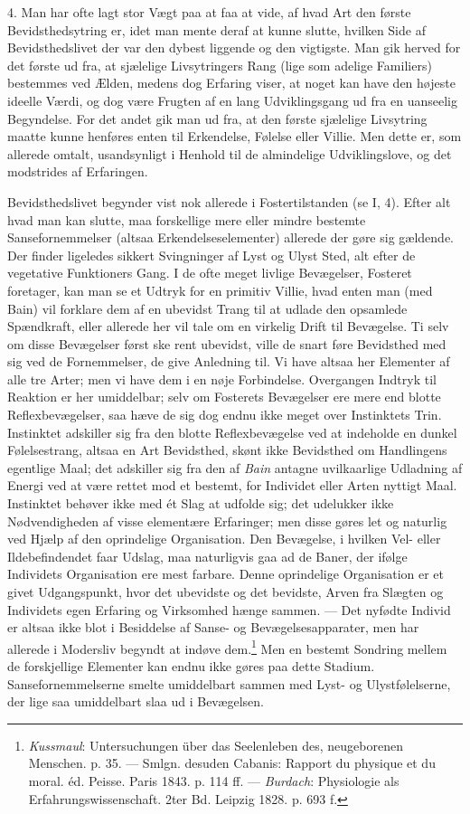 \documentclass[12pt,a4paper,openany]{book}
\newcommand{\opage}[1]{\marginnote{\footnotesize\textit{[#1]}}}
\begin{document}
4. Man har ofte lagt stor Vægt paa at faa at vide, af hvad Art den
første Bevidsthedsytring er, idet man mente deraf at kunne slutte,
hvilken Side af Bevidsthedslivet der var den dybest liggende og den
vigtigste. Man gik herved for det første ud fra, at sjælelige
Livsytringers Rang (lige som adelige Familiers) bestemmes ved Ælden,
medens dog Erfaring viser, at noget kan have den højeste ideelle Værdi,
og dog være Frugten af en lang Udviklingsgang ud fra en uanseelig
Begyndelse. For det andet gik man ud fra, at den første sjælelige
Livsytring maatte kunne henføres enten til Erkendelse, Følelse eller
Villie. Men dette er, som allerede omtalt, usandsynligt i Henhold til de
almindelige Udviklingslove, og det modstrides af Erfaringen.

Bevidsthedslivet begynder vist nok allerede i Fostertilstanden (se I,
4). Efter alt hvad man kan slutte, maa forskellige mere eller mindre
bestemte Sansefornemmelser (altsaa Erkendelseselementer) allerede der
gøre sig gældende. Der finder ligeledes sikkert Svingninger af Lyst og
Ulyst Sted, alt efter de vegetative Funktioners Gang. I de ofte meget
livlige Bevægelser,
\opage{108}Fosteret foretager, kan man se et Udtryk for en primitiv
Villie, hvad enten man (med Bain) vil forklare dem af en ubevidst Trang
til at udlade den opsamlede Spændkraft, eller allerede her vil tale om
en virkelig Drift til Bevægelse. Ti selv om disse Bevægelser først ske
rent ubevidst, ville de snart føre Bevidsthed med sig ved de
Fornemmelser, de give Anledning til. Vi have altsaa her Elementer af
alle tre Arter; men vi have dem i en nøje Forbindelse. Overgangen
Indtryk til Reaktion er her umiddelbar; selv om Fosterets Bevægelser ere
mere end blotte Reflexbevægelser, saa hæve de sig dog endnu ikke meget
over Instinktets Trin. Instinktet adskiller sig fra den blotte
Reflexbevægelse ved at indeholde en dunkel Følelsestrang, altsaa en Art
Bevidsthed, skønt ikke Bevidsthed om Handlingens egentlige Maal; det
adskiller sig fra den af \emph{Bain} antagne uvilkaarlige Udladning af
Energi ved at være rettet mod et bestemt, for Individet eller Arten
nyttigt Maal. Instinktet behøver ikke med ét Slag at udfolde sig; det
udelukker ikke Nødvendigheden af visse elementære Erfaringer; men disse
gøres let og naturlig ved Hjælp af den oprindelige Organisation. Den
Bevægelse, i hvilken Vel- eller Ildebefindendet faar Udslag, maa
naturligvis gaa ad de Baner, der ifølge Individets Organisation ere mest
farbare. Denne oprindelige Organisation er et givet Udgangspunkt, hvor
det ubevidste og det bevidste, Arven fra Slægten og Individets egen
Erfaring og Virksomhed hænge sammen. --- Det nyfødte Individ er altsaa
ikke blot i Besiddelse af Sanse- og Bevægelsesapparater, men har
allerede i Modersliv begyndt at indøve dem.\footnote[1]{\emph{Kussmaul}:
Untersuchungen über das Seelenleben des, neugeborenen Menschen. p. 35.
--- Smlgn. desuden Cabanis: Rapport du physique et du moral. éd. Peisse.
Paris 1843. p. 114 ff. --- \emph{Burdach}: Physiologie als
Erfahrungswissenschaft. 2ter Bd. Leipzig 1828. p. 693 f.} Men en bestemt
Sondring mellem de forskjellige Elementer kan endnu ikke gøres paa dette
Stadium. Sansefornemmelserne smelte umiddelbart sammen med Lyst- og
Ulystfølelserne, der lige saa umiddelbart slaa ud i Bevægelsen.
\end{document}

